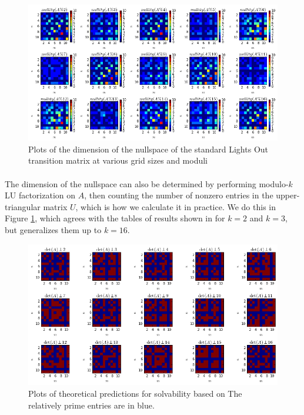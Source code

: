 \documentclass[11pt]{article}
\begin{document}
\begin{figure}
\caption{Plots of the dimension of the nullspace of the standard Lights Out transition matrix at various grid sizes and moduli}
\label{nullity}
\includegraphics[width=\textwidth]{nullity.png}
\end{figure}

\paragraph{} The dimension of the nullspace can also be determined by performing modulo-$k$ LU factorization on $A$, then counting the number of nonzero entries in the upper-triangular matrix $U$, which is how we calculate it in practice. We do this in Figure \ref{nullity}, which agrees with the tables of results shown in \cite{jaap} for $k=2$ and $k=3$, but generalizes them up to $k=16$.

\begin{figure}
\caption{Plots of theoretical predictions for solvability based on \cite{involve}  The relatively prime entries are in blue.}
\label{relprime}
\includegraphics[width=\textwidth]{relprime.png}
\end{figure}
\end{document}
